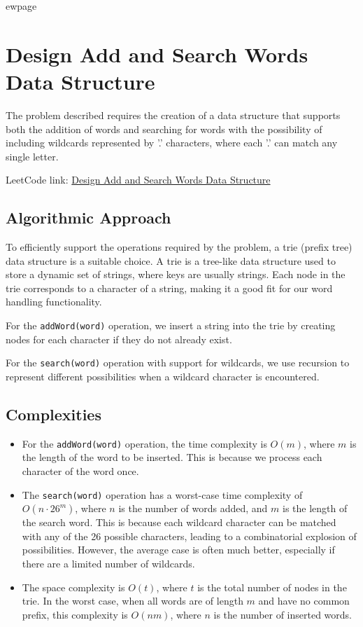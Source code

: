 
ewpage
\chapter{Design Add and Search Words Data Structure}
\label{chap:design_add_search_words_data_structure}

The problem described requires the creation of a data structure that supports both the addition of words and searching for words with the possibility of including wildcards represented by '.' characters, where each '.' can match any single letter.

LeetCode link: \href{https://leetcode.com/problems/design-add-and-search-words-data-structure/}{Design Add and Search Words Data Structure}

\section*{Algorithmic Approach}
To efficiently support the operations required by the problem, a trie (prefix tree) data structure is a suitable choice. A trie is a tree-like data structure used to store a dynamic set of strings, where keys are usually strings. Each node in the trie corresponds to a character of a string, making it a good fit for our word handling functionality.

For the \texttt{addWord(word)} operation, we insert a string into the trie by creating nodes for each character if they do not already exist. 

For the \texttt{search(word)} operation with support for wildcards, we use recursion to represent different possibilities when a wildcard character is encountered.

\section*{Complexities}
\begin{itemize}
    \item For the \texttt{addWord(word)} operation, the time complexity is \(O(m)\), where \(m\) is the length of the word to be inserted. This is because we process each character of the word once.
    
    \item The \texttt{search(word)} operation has a worst-case time complexity of \(O(n \cdot 26^m)\), where \(n\) is the number of words added, and \(m\) is the length of the search word. This is because each wildcard character can be matched with any of the 26 possible characters, leading to a combinatorial explosion of possibilities. However, the average case is often much better, especially if there are a limited number of wildcards.
    
    \item The space complexity is \(O(t)\), where \(t\) is the total number of nodes in the trie. In the worst case, when all words are of length \(m\) and have no common prefix, this complexity is \(O(n m)\), where \(n\) is the number of inserted words.
\end{itemize}


